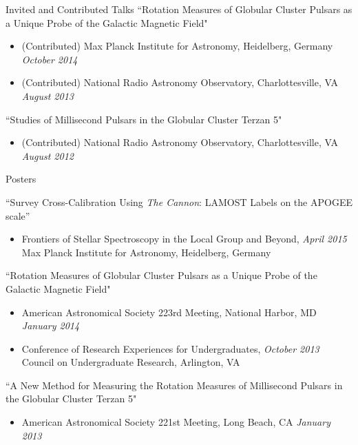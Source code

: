 \documentclass{resume} %
\begin{document}
\begin{rSection}{Invited and Contributed Talks}
``Rotation Measures of Globular Cluster Pulsars as a Unique Probe of the Galactic Magnetic Field"
\begin{itemize}
\item
(Contributed) Max Planck Institute for Astronomy,
Heidelberg, Germany \hfill {\em October 2014}
\item
(Contributed) National Radio Astronomy Observatory, 
Charlottesville, VA \hfill {\em August 2013} 
\end{itemize}


``Studies of Millisecond Pulsars in the Globular Cluster Terzan 5" 
\begin{itemize}
\item
(Contributed) National Radio Astronomy Observatory, 
Charlottesville, VA \hfill {\em August 2012} 
\end{itemize}

\end{rSection}


\begin{rSection}{Posters}

``Survey Cross-Calibration Using \emph{The Cannon}:
LAMOST Labels on the APOGEE scale''
\begin{itemize}
  \item
    Frontiers of Stellar Spectroscopy in the Local Group and Beyond,
    \hfill {\em April 2015}\\
    Max Planck Institute for Astronomy, Heidelberg, Germany 

\end{itemize}

``Rotation Measures of Globular Cluster Pulsars as a Unique Probe of the Galactic Magnetic Field"
\begin{itemize}
\item
American Astronomical Society 223rd Meeting, 
National Harbor, MD \hfill {\em January 2014}
\item
Conference of Research Experiences for Undergraduates, \hfill {\em October 2013}\\
Council on Undergraduate Research, Arlington, VA 
\end{itemize}

``A New Method for Measuring the Rotation Measures of Millisecond Pulsars in the Globular Cluster Terzan 5" 
\begin{itemize}
\item
American Astronomical Society 221st Meeting, 
Long Beach, CA \hfill {\em January 2013}
\end{itemize}

\end{rSection}
\end{document}
